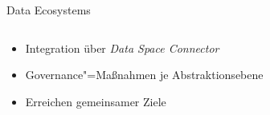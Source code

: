 \begin{frame}{Data Ecosystems \footnotesize\cite{mollerIndustrialDataEcosystems2024}}
\begin{columns}
\begin{column}{0.6\textwidth}
\begin{itemize}
                \item<5-> Integration über \emph{Data Space Connector}
                \item<5-> Governance"=Maßnahmen je Abstraktionsebene
                \item<5-> Erreichen gemeinsamer Ziele
            \end{itemize}
        \end{column}

        \begin{column}{0.4\textwidth}
        \end{column}
    \end{columns}

\end{frame}
